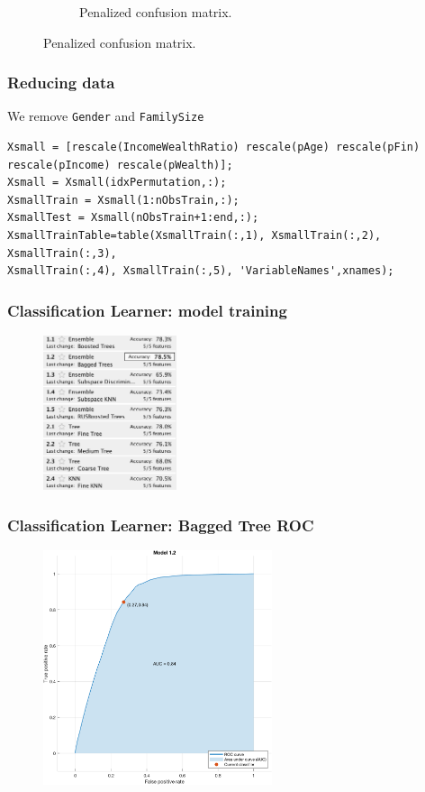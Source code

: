 \documentclass{beamer}
\begin{document}
\begin{frame}
\begin{figure}
\begin{subfigure}[t]{0.48\textwidth}
            \caption{Penalized confusion matrix.}
        \end{subfigure}
    \end{figure}
\end{frame}

\begin{frame}[fragile]
\frametitle{Reducing data}
We remove \texttt{Gender} and \texttt{FamilySize}
\tiny
\begin{verbatim}
Xsmall = [rescale(IncomeWealthRatio) rescale(pAge) rescale(pFin) rescale(pIncome) rescale(pWealth)];
Xsmall = Xsmall(idxPermutation,:);
XsmallTrain = Xsmall(1:nObsTrain,:);
XsmallTest = Xsmall(nObsTrain+1:end,:);
XsmallTrainTable=table(XsmallTrain(:,1), XsmallTrain(:,2), XsmallTrain(:,3),
XsmallTrain(:,4), XsmallTrain(:,5), 'VariableNames',xnames);
\end{verbatim}
\end{frame}

\begin{frame}
    \frametitle{Classification Learner: model training}
    \begin{figure}
    	\centering
    	\includegraphics[width=0.35\textwidth]{modelstrained_small}
    \end{figure}
\end{frame}

\begin{frame}
    \frametitle{Classification Learner: Bagged Tree ROC}
    \begin{figure}
    	\centering
    	\includegraphics[width=0.6\textwidth]{cl_2_roc}
    \end{figure}
\end{frame}
\end{document}

